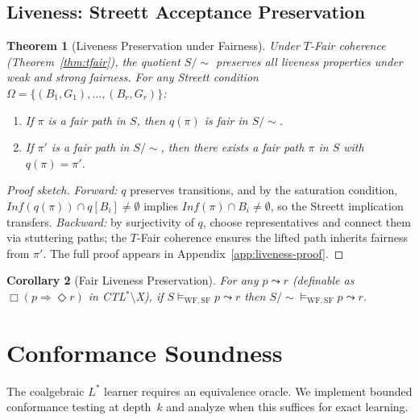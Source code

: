 \documentclass[11pt]{article}
\newtheorem{theorem}{Theorem}
\newtheorem{corollary}[theorem]{Corollary}
\newcommand{\WF}{\ensuremath{\mathrm{WF}}}
\newcommand{\SF}{\ensuremath{\mathrm{SF}}}
\newcommand{\TFair}{$T$-Fair}
\begin{document}
\subsection{Liveness: Streett Acceptance Preservation}

\begin{theorem}[Liveness Preservation under Fairness]
\label{thm:liveness}
Under \TFair{} coherence (Theorem~\ref{thm:tfair}), the quotient
$S/{\sim}$ preserves all liveness properties under weak and strong
fairness.
For any Streett condition $\Omega = \{(B_1, G_1), \ldots, (B_r, G_r)\}$:
\begin{enumerate}[nosep]
\item If $\pi$ is a fair path in $S$, then $q(\pi)$ is fair in $S/{\sim}$.
\item If $\pi'$ is a fair path in $S/{\sim}$, then there exists a fair
  path $\pi$ in $S$ with $q(\pi) = \pi'$.
\end{enumerate}
\end{theorem}

\begin{proof}[Proof sketch]
\emph{Forward:} $q$ preserves transitions, and by the saturation
condition, $\mathit{Inf}(q(\pi)) \cap q[B_i] \neq \emptyset$ implies
$\mathit{Inf}(\pi) \cap B_i \neq \emptyset$, so the Streett implication
transfers.
\emph{Backward:} by surjectivity of $q$, choose representatives and
connect them via stuttering paths; the \TFair{} coherence ensures the
lifted path inherits fairness from $\pi'$.
The full proof appears in Appendix~\ref{app:liveness-proof}.
\end{proof}

\begin{corollary}[Fair Liveness Preservation]
\label{cor:fair-live}
For any $p \leadsto r$ (definable as $\Box(p \Rightarrow \Diamond r)$
in CTL$^*$$\setminus$X), if $S \models_{\WF,\SF} p \leadsto r$ then
$S/{\sim} \models_{\WF,\SF} p \leadsto r$.
\end{corollary}

\section{Conformance Soundness}
\label{sec:conformance}

The coalgebraic $L^*$ learner requires an equivalence oracle.
We implement bounded conformance testing at depth~$k$ and analyze when
this suffices for exact learning.
\end{document}
